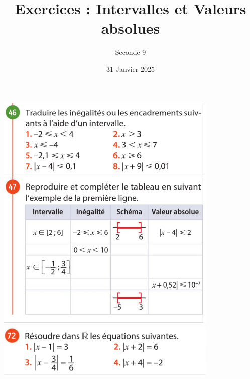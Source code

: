 \documentclass{article}
\title{Exercices : Intervalles et Valeurs absolues}
\date{31 Janvier 2025}
\author{Seconde 9}
\begin{document}
\maketitle

\begin{center}
\includegraphics[width=0.8\textwidth]{Exercice_1.png}
\includegraphics[width=0.8\textwidth]{Exercice_2.png}
\end{center}
\end{document}
